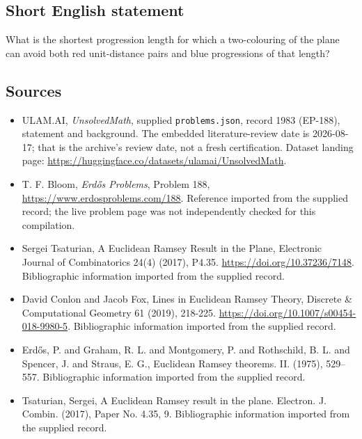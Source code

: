 \documentclass[11pt,a4paper]{article}
\begin{document}
\subsection{Short English statement}

What is the shortest progression length for which a two-colouring of the plane can avoid both red unit-distance pairs and blue progressions of that length?

\subsection{Sources}

{\small

\begin{itemize}

\item[\hypertarget{source:1983:1}{S1}] ULAM.AI, \emph{UnsolvedMath}, supplied \texttt{problems.json}, record 1983 (EP-188), statement and background. The embedded literature-review date is 2026-08-17; that is the archive’s review date, not a fresh certification. Dataset landing page: \url{https://huggingface.co/datasets/ulamai/UnsolvedMath}.

\item[\hypertarget{source:1983:2}{S2}] T. F. Bloom, \emph{Erdős Problems}, Problem 188, \url{https://www.erdosproblems.com/188}. Reference imported from the supplied record; the live problem page was not independently checked for this compilation.

\item[\hypertarget{source:1983:3}{S3}] Sergei Tsaturian, A Euclidean Ramsey Result in the Plane, Electronic Journal of Combinatorics 24(4) (2017), P4.35. \url{https://doi.org/10.37236/7148}. Bibliographic information imported from the supplied record.

\item[\hypertarget{source:1983:4}{S4}] David Conlon and Jacob Fox, Lines in Euclidean Ramsey Theory, Discrete \& Computational Geometry 61 (2019), 218-225. \url{https://doi.org/10.1007/s00454-018-9980-5}. Bibliographic information imported from the supplied record.

\item[\hypertarget{source:1983:5}{S5}] Erd\H{o}s, P. and Graham, R. L. and Montgomery, P. and Rothschild, B. L. and Spencer, J. and Straus, E. G., Euclidean {R}amsey theorems. {II}. (1975), 529--557. Bibliographic information imported from the supplied record.

\item[\hypertarget{source:1983:6}{S6}] Tsaturian, Sergei, A {E}uclidean {R}amsey result in the plane. Electron. J. Combin. (2017), Paper No. 4.35, 9. Bibliographic information imported from the supplied record.

\end{itemize}

}

\label{end:1983}
\end{document}
